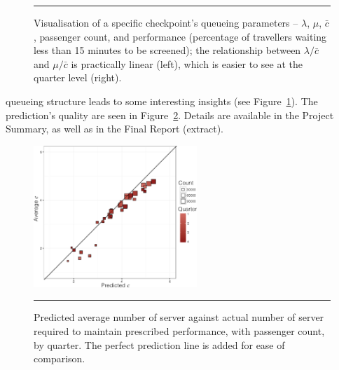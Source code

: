 \begin{figure}[!t]
\caption[\small Visualisation of a checkpoint's queueing parameters]{\small Visualisation of a specific checkpoint's queueing parameters -- $\lambda$, $\mu$, $\bar{c}$, passenger count, and performance (percentage of travellers waiting less than 15 minutes to be screened); the relationship between $\lambda/\bar{c}$ and $\mu/\bar{c}$ is practically linear (left), which is easier to see at the quarter level (right).}\label{fig:checkpoint}\hrule
\end{figure}\afterpage{\FloatBarrier}
 queueing structure leads to some interesting insights  (see Figure~\ref{fig:checkpoint}). The prediction's quality are seen in Figure~\ref{fig:predsCATSA}. Details are available in the Project Summary, as well as in the Final Report (extract). 
\newpage\noindent
\begin{figure}[H]
\centering
\includegraphics[width=0.55\textwidth]{images/QSD/CATSA4.png}  
\caption[\small Predicted number of servers]{\small Predicted average number of server against actual number of server required to maintain prescribed performance, with passenger count, by quarter. The perfect prediction line is added for ease of comparison.}\label{fig:predsCATSA}\hrule
\end{figure}\afterpage{\FloatBarrier}

